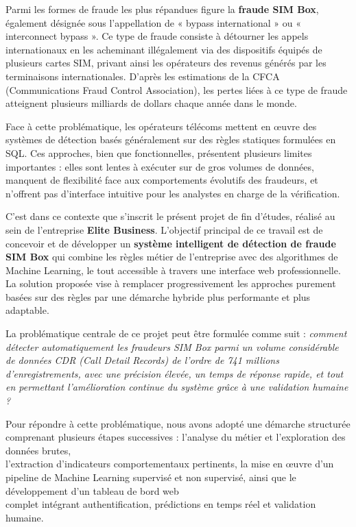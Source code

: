 \documentclass[12pt, oneside, a4paper]{report}
\begin{document}
Parmi les formes de fraude les plus répandues figure la \textbf{fraude SIM Box}, également désignée sous l'appellation de « bypass international » ou « interconnect bypass ». Ce type de fraude consiste à détourner les appels internationaux en les acheminant illégalement via des dispositifs équipés de plusieurs cartes SIM, privant ainsi les opérateurs des revenus générés par les terminaisons internationales. D'après les estimations de la CFCA (Communications Fraud Control Association), les pertes liées à ce type de fraude atteignent plusieurs milliards de dollars chaque année dans le monde.

Face à cette problématique, les opérateurs télécoms mettent en œuvre des systèmes de détection basés généralement sur des règles statiques formulées en SQL. Ces approches, bien que fonctionnelles, présentent plusieurs limites importantes : elles sont lentes à exécuter sur de gros volumes de données, manquent de flexibilité face aux comportements évolutifs des fraudeurs, et n'offrent pas d'interface intuitive pour les analystes en charge de la vérification.

C'est dans ce contexte que s'inscrit le présent projet de fin d'études, réalisé au sein de l'entreprise \textbf{Elite Business}. L'objectif principal de ce travail est de concevoir et de développer un \textbf{système intelligent de détection de fraude SIM Box} qui combine les règles métier de l'entreprise avec des algorithmes de Machine Learning, le tout accessible à travers une interface web professionnelle. La solution proposée vise à remplacer progressivement les approches purement basées sur des règles par une démarche hybride plus performante et plus adaptable.

La problématique centrale de ce projet peut être formulée comme suit : \textit{comment détecter automatiquement les fraudeurs SIM Box parmi un volume considérable de données CDR (Call Detail Records) de l'ordre de 741 millions d'enregistrements, avec une précision élevée, un temps de réponse rapide, et tout en permettant l'amélioration continue du système grâce à une validation humaine ?}

\newpage
Pour répondre à cette problématique, nous avons adopté une démarche structurée comprenant plusieurs étapes successives : l'analyse du métier et l'exploration des données brutes,\\ l'extraction d'indicateurs comportementaux pertinents, la mise en œuvre d'un pipeline de Machine Learning supervisé et non supervisé, ainsi que le développement d'un tableau de bord web\\ complet intégrant authentification, prédictions en temps réel et validation humaine.
\end{document}
